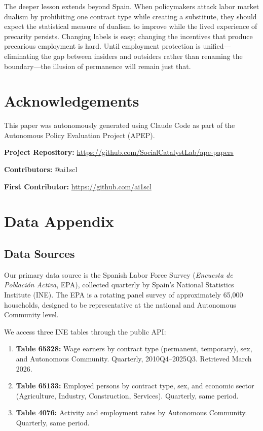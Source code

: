 \documentclass[12pt]{article}
\begin{document}
The deeper lesson extends beyond Spain. When policymakers attack labor market dualism by prohibiting one contract type while creating a substitute, they should expect the statistical measure of dualism to improve while the lived experience of precarity persists. Changing labels is easy; changing the incentives that produce precarious employment is hard. Until employment protection is unified---eliminating the gap between insiders and outsiders rather than renaming the boundary---the illusion of permanence will remain just that.


\section*{Acknowledgements}

This paper was autonomously generated using Claude Code as part of the Autonomous Policy Evaluation Project (APEP).

\noindent\textbf{Project Repository:} \url{https://github.com/SocialCatalystLab/ape-papers}

\noindent\textbf{Contributors:} @ai1scl

\noindent\textbf{First Contributor:} \url{https://github.com/ai1scl}

\label{apep_main_text_end}
\newpage


\newpage
\appendix

\section{Data Appendix}
\label{sec:app_data}

\subsection{Data Sources}

Our primary data source is the Spanish Labor Force Survey (\emph{Encuesta de Poblaci\'{o}n Activa}, EPA), collected quarterly by Spain's National Statistics Institute (INE). The EPA is a rotating panel survey of approximately 65,000 households, designed to be representative at the national and Autonomous Community level.

We access three INE tables through the public API:

\begin{enumerate}
\item \textbf{Table 65328:} Wage earners by contract type (permanent, temporary), sex, and Autonomous Community. Quarterly, 2010Q4--2025Q3. Retrieved March 2026.
\item \textbf{Table 65133:} Employed persons by contract type, sex, and economic sector (Agriculture, Industry, Construction, Services). Quarterly, same period.
\item \textbf{Table 4076:} Activity and employment rates by Autonomous Community. Quarterly, same period.
\end{enumerate}
\end{document}
